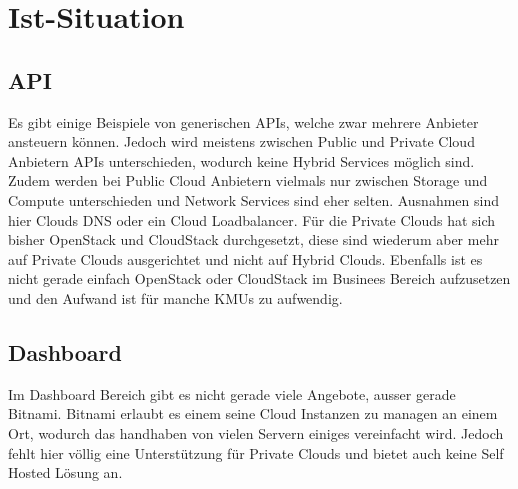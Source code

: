 \section{Ist-Situation}
\subsection{API}
Es gibt einige Beispiele von generischen APIs, welche zwar mehrere Anbieter 
ansteuern können.
Jedoch wird meistens zwischen Public und Private Cloud Anbietern APIs 
unterschieden, wodurch keine Hybrid Services möglich sind.
Zudem werden bei Public Cloud Anbietern vielmals nur zwischen Storage und 
Compute unterschieden und Network Services sind eher selten.
Ausnahmen sind hier Clouds DNS oder ein Cloud Loadbalancer.
Für die Private Clouds hat sich bisher OpenStack und CloudStack durchgesetzt, 
diese sind wiederum aber mehr auf Private Clouds ausgerichtet und nicht auf Hybrid 
Clouds.
Ebenfalls ist es nicht gerade einfach OpenStack oder CloudStack im Businees 
Bereich aufzusetzen und den Aufwand ist für manche KMUs zu aufwendig.



\subsection{Dashboard}

Im Dashboard Bereich gibt es nicht gerade viele Angebote, ausser gerade Bitnami.
Bitnami erlaubt es einem seine Cloud Instanzen zu managen an einem Ort, wodurch 
das handhaben von vielen Servern einiges vereinfacht wird.
Jedoch fehlt hier völlig eine Unterstützung für Private Clouds und bietet auch keine Self Hosted Lösung an.